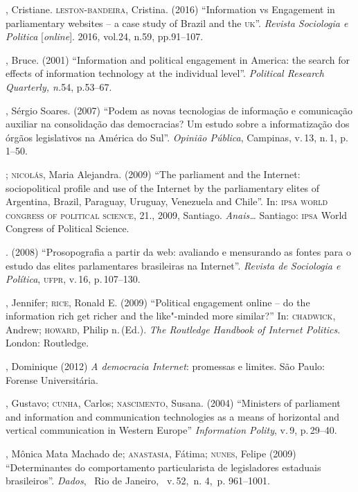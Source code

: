 \begin{bibliohedra}
, Cristiane. \textsc{leston}-\textsc{bandeira}, Cristina. (2016) ``Information vs
Engagement in parliamentary websites -- a case study of Brazil and the
\textsc{uk}''. \emph{Revista Sociologia e Politica} {[}\emph{online}{]}. 2016, vol.24,
n.59, pp.91--107.

, Bruce. (2001) ``Information and political engagement in America:
the search for effects of information technology at the individual
level''. \emph{Political Research Quarterly, n.}54, p.53--67.

, Sérgio Soares. (2007) ``Podem as novas tecnologias de informação
e comunicação auxiliar na consolidação das democracias? Um estudo sobre
a informatização dos órgãos legislativos na América do Sul''.
\emph{Opinião Pública}, Campinas, v.\,13, n.\,1, p.\,1--50.

\titidem; \textsc{nicolás}, Maria Alejandra. (2009) ``The parliament and the
Internet: sociopolitical profile and use of the Internet by the
parliamentary elites of Argentina, Brazil, Paraguay, Uruguay, Venezuela
and Chile''. In: \textsc{ipsa world congress of political science}, 21., 2009,
Santiago. \emph{Anais\ldots{}} Santiago: \textsc{ipsa} World Congress of Political
Science.

\titidem. (2008) ``Prosopografia a partir
da web: avaliando e mensurando as fontes para o estudo das elites
parlamentares brasileiras na Internet''. \emph{Revista de Sociologia e
Política}, \textsc{ufpr}, v.\,16, p.\,107--130.

, Jennifer; \textsc{rice}, Ronald E. (2009) ``Political engagement
online -- do the information rich get richer and the like"-minded more
similar?'' In: \textsc{chadwick}, Andrew; \textsc{howard}, Philip n.\,(Ed.). \emph{The
Routledge Handbook of Internet Politics}. London: Routledge.

, Dominique (2012) \emph{A democracia Internet}: promessas e
limites. São Paulo: Forense Universitária.

, Gustavo; \textsc{cunha}, Carlos; \textsc{nascimento}, Susana. (2004) ``Ministers
of parliament and information and communication technologies as a means
of horizontal and vertical communication in Western Europe''
\emph{Information Polity}, v.\,9, p.\,29--40.

, Mônica Mata Machado de; \textsc{anastasia}, Fátima; \textsc{nunes}, Felipe (2009)
``Determinantes do comportamento particularista de legisladores
estaduais brasileiros''. \emph{Dados},~ Rio de Janeiro,~ v.\,52,~n. 4,~p.
961--1001.


\end{bibliohedra}
